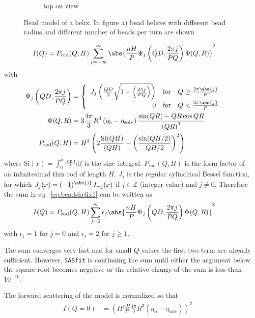 \begin{figure}[htb]
\begin{subfigure}[b]{.48\textwidth}
   \caption{top on view}
   \label{fig:beadshelixside2}
\end{subfigure}
\caption{Bead model of a helix. In figure a) bead helices with different bead radius and different number of beads per turn are shown} \label{fig:beadshelix}
\end{figure}

\begin{align}
I(Q) &= P_\text{rod}(Q,H) \sum_{j=-\infty}^{\infty} \abs{\frac{nH}{P}\Psi_j\left(QD,\frac{2\pi j}{PQ}\right) \Phi(Q,R)}^2
\label{eq:beadshelix1}
\end{align}
with
\begin{align}
\Psi_j\left(QD,\frac{2\pi j}{PQ}\right) &=
\begin{cases}
\begin{array}{rcl}
J_j\left(\frac{QD}{2}\sqrt{1-\left(\frac{2\pi j}{PQ}\right)}\right) & \text{for} & Q\geq \frac{2\pi\abs{j}}{P}\\
0 & \text{for} & Q < \frac{2\pi\abs{j}}{P}
\end{array}
\end{cases}\\
\Phi(Q,R) &= 3\frac{4\pi}{3}R^3\left(\eta_\text{b}-\eta_\text{solv}\right)\frac{\sin(QR)-QR\cos{QR}}{\left(QR\right)^3} \\
P_\text{rod}(Q,H) &= H^2 \left(2\frac{\mathrm{Si}(QH)}{(QH)}-\left(\frac{\sin(QH/2)}{QH/2}\right)^2\right)
\end{align}
where $\mathrm{Si}(x)=\int_0^x\frac{\sin t}{t}\mathrm{d}t$ is the sine integral. $P_\text{rod}(Q,H)$ is the form factor of an infinitesimal thin rod of length $H$.
$J_j$ is the regular cylindrical Bessel function, for which $J_{j}(x)=(-1)^\abs{j}J_{-j}(x)$ if $j\in \mathbb{Z}$ (integer value) and $j \neq 0$.
Therefore the sum in eq.\ \ref{eq:beadshelix1} can be written as
\begin{align}
I(Q) &= P_\text{rod}(Q,H) \sum_{j=0}^{\infty} \epsilon_j \abs{\frac{nH}{P}\Psi_j\left(QD,\frac{2\pi j}{PQ}\right) \Phi(Q,R)}^2
\label{eq:beadshelix2}
\end{align}
with $\epsilon_j=1$ for $j=0$ and $\epsilon_j=2$ for $j\geq 1$.

The sum converges very fast and for small $Q$-values the first two term are already sufficient. However, {\tt SASfit} is continuing the sum until either the argument below the square root becomes negative or the relative change of the sum is less than $10^{-10}$.

The forward scattering of the model is normalized so that
\begin{align}
I(Q=0) &= \left(H\frac{nH}{P}\frac{4\pi}{3}R^3\left(\eta_\text{b}-\eta_\text{solv}\right)\right)^2
\end{align}


